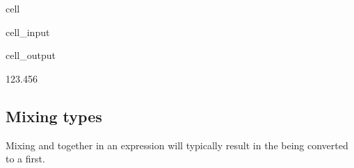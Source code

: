 \documentclass[letterpaper,10pt,english]{jupyterBook}
\begin{document}
\begin{sphinxuseclass}{cell}\begin{sphinxVerbatimInput}

\begin{sphinxuseclass}{cell_input}
\begin{sphinxVerbatim}[commandchars=\\\{\}]
\end{sphinxVerbatim}

\end{sphinxuseclass}\end{sphinxVerbatimInput}
\begin{sphinxVerbatimOutput}

\begin{sphinxuseclass}{cell_output}
\begin{sphinxVerbatim}[commandchars=\\\{\}]
123.456
\end{sphinxVerbatim}

\end{sphinxuseclass}\end{sphinxVerbatimOutput}

\end{sphinxuseclass}

\subsection{Mixing types}
\label{\detokenize{datatypes:mixing-types}}
\sphinxAtStartPar
Mixing  and  together in an expression will typically result in the  being converted to a  first.
\end{document}
